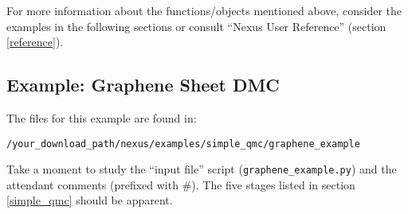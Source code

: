 \documentclass[oneside,11pt]{memoir}
\numberwithin{equation}{section}
\begin{document}
For more information about the functions/objects mentioned above, consider 
the examples in the following sections or consult ``Nexus User 
Reference'' (section \ref{reference}).


\pagebreak
\subsection{Example: Graphene Sheet DMC} \label{graphene_dmc}
The files for this example are found in:
\begin{shaded}
\begin{verbatim}
/your_download_path/nexus/examples/simple_qmc/graphene_example
\end{verbatim}
\end{shaded}

Take a moment to study the ``input file'' script 
(\texttt{graphene\_example.py}) and the attendant comments 
(prefixed with \#). The five stages listed in section \ref{simple_qmc} should 
be apparent.
\end{document}

